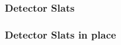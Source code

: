 \documentclass{beamer}
\begin{document}
\begin{frame}
\frametitle{Detector Slats}
\end{frame}
\begin{frame}
\frametitle{Detector Slats in place}
\end{frame}
\end{document}
